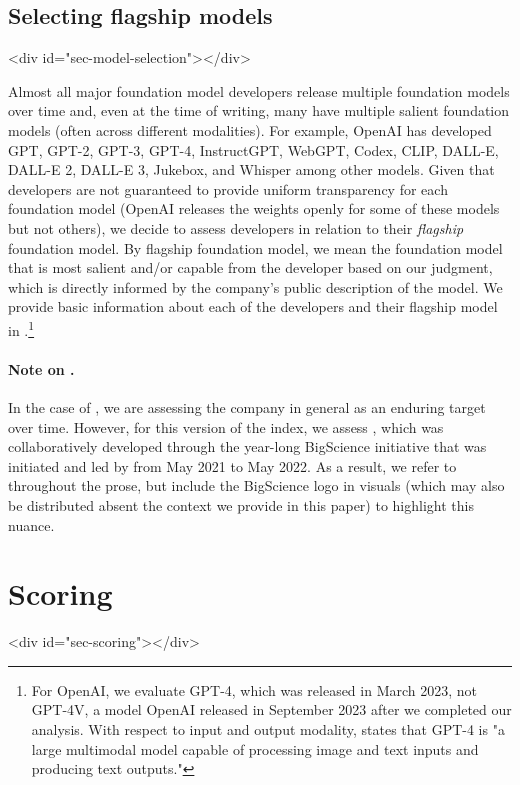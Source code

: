 \documentclass[screen, authorversion, acmsmall]{acmart}
\begin{document}
\hypertarget{model-selection}{\subsection{Selecting flagship models}}
<div id="sec-model-selection"></div>

Almost all major foundation model developers release multiple foundation models over time and, even at the time of writing, many have multiple salient foundation models (often across different modalities).
For example, OpenAI has developed GPT, GPT-2, GPT-3, GPT-4, InstructGPT, WebGPT, Codex, CLIP, DALL-E, DALL-E 2, DALL-E 3, Jukebox, and Whisper among other models.
Given that developers are not guaranteed to provide uniform transparency for each foundation model (\eg OpenAI releases the weights openly for some of these models but not others), we decide to assess developers in relation to their \textit{flagship} foundation model.
By flagship foundation model, we mean the foundation model that is most salient and/or capable from the developer based on our judgment, which is directly informed by the company's public description of the model.
We provide basic information about each of the developers and their flagship model in .\footnote{For OpenAI, we evaluate GPT-4, which was released in March 2023, not GPT-4V, a model OpenAI released in September 2023 after we completed our analysis. With respect to input and output modality, \citet{openai2023gpt4} states that GPT-4 is "a large multimodal model capable of processing image and text inputs and producing text outputs."}

\paragraph{Note on \huggingface.}
In the case of \huggingface, we are assessing the company in general as an enduring target over time.
However, for this version of the index, we assess \bloomz \citep{muennighoff2022crosslingual}, which was collaboratively developed through the year-long BigScience initiative that was initiated and led by \huggingface from May 2021 to May 2022. 
As a result, we refer to \huggingface throughout the prose, but include the BigScience logo in visuals (which may also be distributed absent the context we provide in this paper) to highlight this nuance.
\clearpage
\hypertarget{scoring}{\section{Scoring}}
<div id="sec-scoring"></div>
\end{document}
